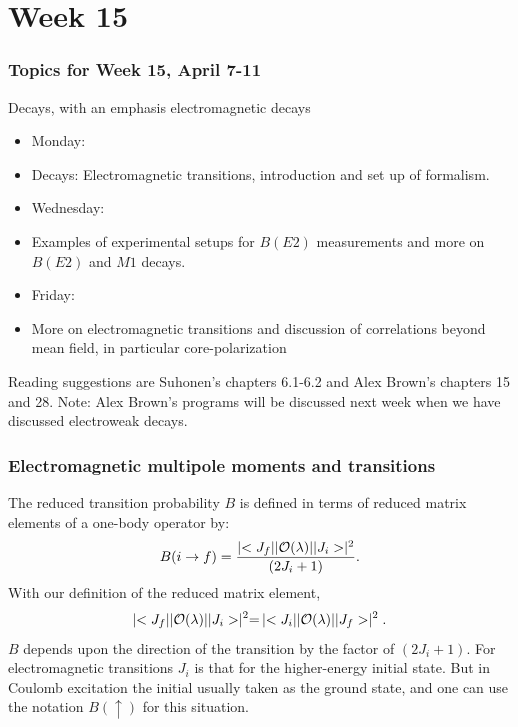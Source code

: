 \documentclass[compress]{beamer}
\begin{document}
\section[Week 15]{Week 15}
\frame
{
  \frametitle{Topics for Week 15, April 7-11}
  \begin{block}{Decays, with an emphasis electromagnetic decays}
\begin{itemize}
\item Monday:
\item Decays: Electromagnetic transitions, introduction and set up of formalism.
\item Wednesday:
\item Examples of experimental setups for $B(E2)$ measurements and more on $B(E2)$ and $M1$ decays.
\item Friday:
\item More on electromagnetic transitions and discussion of correlations beyond mean field, in particular core-polarization
\end{itemize}
Reading suggestions are Suhonen's chapters 6.1-6.2 and Alex Brown's chapters 15 and 28. Note: Alex Brown's programs will be discussed next week when we have discussed electroweak decays. 
  \end{block}
} 


\frame
{
\frametitle{Electromagnetic multipole moments and transitions}
\begin{small}
{\scriptsize
The reduced
transition probability $  B $ is defined in terms of reduced matrix
elements of a one-body operator by:
$$
B(i \rightarrow f)
= \frac{\mid <J_{f}||{\cal O}(\lambda )||J_{i}>\mid ^{2}}{(2J_{i}+1)}. 
$$
With our definition of the reduced matrix element,
$$
\mid <J_{f}||{\cal O}(\lambda )||J_{i}>\mid ^{2} =\, \mid <J_{i}||{\cal O}(\lambda )||J_{f}>\mid 
^{2}.  
$$
$  B  $ depends upon the direction of the transition by the factor
of $  (2J_{i}+1)  $. For electromagnetic
transitions $  J_{i}  $ is that for the higher-energy initial state. But in
Coulomb excitation the initial usually
taken as the ground state, and one can
use the notation $  B(\uparrow)  $ for this situation.

}
\end{small}
}
\end{document}
